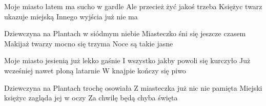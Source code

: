\documentclass[../../../songbook.tex]{subfiles}
\begin{document}
Moje miasto latem ma sucho w gardle \newline
Ale przecież żyć jakoś trzeba \newline
Księżyc twarz ukazuje miejską \newline
Innego wyjścia już nie ma \newline

\-\hspace{1cm} Dziewczyna na Plantach w siódmym niebie \newline
\-\hspace{1cm} Miasteczko śni się jeszcze czasem \newline
\-\hspace{1cm} Makijaż twarzy mocno się trzyma \newline
\-\hspace{1cm} Noce są takie jasne \newline

Moje miasto jesienią już lekko gaśnie \newline
I wszystko jakby powoli się kurczyło \newline
Już wcześniej nawet płoną latarnie \newline
W knajpie kończy się piwo \newline

\-\hspace{1cm} Dziewczyna na Plantach trochę osowiała \newline
\-\hspace{1cm} Z miasteczka już nic nie pamięta \newline
\-\hspace{1cm} Miejski księżyc zagląda jej w oczy \newline
\-\hspace{1cm} Za chwilę będą chyba święta \newline
\end{document}

